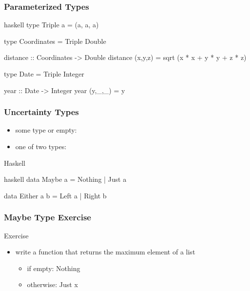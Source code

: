 \documentclass[dvipsnames]{beamer}
\theoremstyle{plain}
\begin{document}
\begin{frame}[fragile]
  \frametitle{Parameterized Types}

  \begin{example}[Haskell]
    \begin{pygments}{haskell}
type Triple a = (a, a, a)

type Coordinates = Triple Double

distance :: Coordinates -> Double
distance (x,y,z) = sqrt (x * x + y * y + z * z)

type Date = Triple Integer

year :: Date -> Integer
year (y,_,_) = y
    \end{pygments}
  \end{example}
\end{frame}

\begin{frame}[fragile]
  \frametitle{Uncertainty Types}

  \begin{itemize}
    \item some type or empty: 
    \item one of two types: 
  \end{itemize}

  \begin{block}{Haskell}
    \begin{pygments}{haskell}
data Maybe a = Nothing | Just a

data Either a b = Left a | Right b
    \end{pygments}
  \end{block}
\end{frame}

\begin{frame}
  \frametitle{Maybe Type Exercise}

  \begin{block}{Exercise}
    \begin{itemize}
      \item write a function that returns the maximum element of a list
      \begin{itemize}
        \item if empty: Nothing
        \item otherwise: Just x
      \end{itemize}
    \end{itemize}
  \end{block}
\end{frame}
\end{document}
